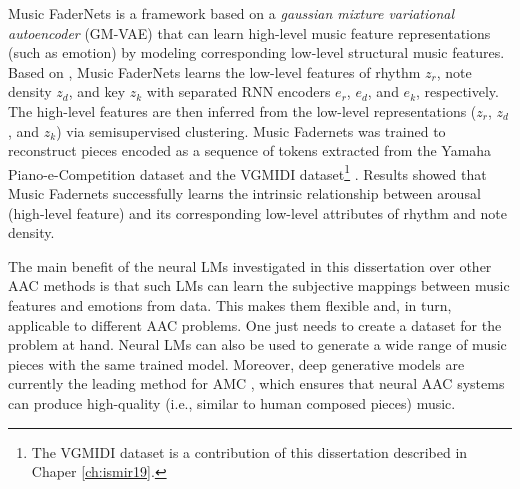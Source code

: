 Music FaderNets \cite{tan2020music} is a framework based on a \textit{gaussian mixture variational autoencoder} (GM-VAE) that can learn high-level music feature representations (such as emotion) by modeling corresponding low-level structural music features. Based on \citet{yang2019deep}, Music FaderNets learns the low-level features of rhythm $z_r$, note density $z_d$, and key $z_k$ with separated RNN encoders $e_r$, $e_d$, and $e_k$, respectively. The high-level features are then inferred from the low-level representations ($z_r$, $z_d$, and $z_k$) via semisupervised clustering. Music Fadernets was trained to reconstruct pieces encoded as a sequence of tokens \cite{oore2017learning} extracted from the Yamaha Piano-e-Competition dataset \cite{yamahaEPiano} and the VGMIDI dataset\footnote{The VGMIDI dataset is a contribution of this dissertation described in Chaper \ref{ch:ismir19}.} \cite{ferreira_2019}. Results showed that Music Fadernets successfully learns the intrinsic relationship between arousal (high-level feature) and its corresponding low-level attributes of rhythm and note density.


The main benefit of the neural LMs investigated in this dissertation over other AAC methods is that such LMs can learn the subjective mappings between music features and emotions from data. This makes them flexible and, in turn, applicable to different AAC problems. One just needs to create a dataset for the problem at hand. Neural LMs can also be used to generate a wide range of music pieces with the same trained model. Moreover, deep generative models are currently the leading method for AMC \cite{yang2019deep}, which ensures that neural AAC systems can produce high-quality (i.e., similar to human composed pieces) music.


